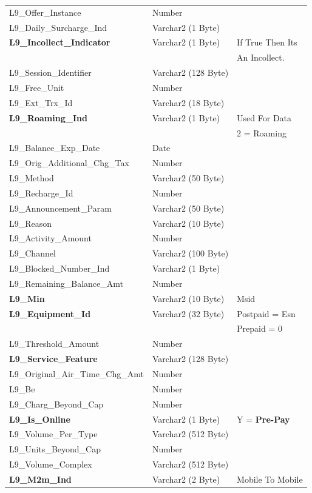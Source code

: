 \documentclass[12pt,twoside]{article}
\begin{document}
\begin{longtable}{l|l|l}
L9\_Offer\_Instance & Number & \\
L9\_Daily\_Surcharge\_Ind & Varchar2 (1 Byte) & \\
\textbf{L9\_Incollect\_Indicator} & Varchar2 (1 Byte) & If True Then Its\\
 &  & An Incollect.\\
L9\_Session\_Identifier & Varchar2 (128 Byte) & \\
L9\_Free\_Unit & Number & \\
L9\_Ext\_Trx\_Id & Varchar2 (18 Byte) & \\
\textbf{L9\_Roaming\_Ind} & Varchar2 (1 Byte) & Used For Data\\
 &  & 2 = Roaming\\
L9\_Balance\_Exp\_Date & Date & \\
L9\_Orig\_Additional\_Chg\_Tax & Number & \\
L9\_Method & Varchar2 (50 Byte) & \\
L9\_Recharge\_Id & Number & \\
L9\_Announcement\_Param & Varchar2 (50 Byte) & \\
L9\_Reason & Varchar2 (10 Byte) & \\
L9\_Activity\_Amount & Number & \\
L9\_Channel & Varchar2 (100 Byte) & \\
L9\_Blocked\_Number\_Ind & Varchar2 (1 Byte) & \\
L9\_Remaining\_Balance\_Amt & Number & \\
\textbf{L9\_Min} & Varchar2 (10 Byte) & Msid\\
\textbf{L9\_Equipment\_Id} & Varchar2 (32 Byte) & Postpaid = Esn\\
 &  & Prepaid = 0\\
L9\_Threshold\_Amount & Number & \\
\textbf{L9\_Service\_Feature} & Varchar2 (128 Byte) & \\
L9\_Original\_Air\_Time\_Chg\_Amt & Number & \\
L9\_Be & Number & \\
L9\_Charg\_Beyond\_Cap & Number & \\
\textbf{L9\_Is\_Online} & Varchar2 (1 Byte) & Y = \textbf{Pre-Pay}\\
L9\_Volume\_Per\_Type & Varchar2 (512 Byte) & \\
L9\_Units\_Beyond\_Cap & Number & \\
L9\_Volume\_Complex & Varchar2 (512 Byte) & \\
\textbf{L9\_M2m\_Ind} & Varchar2 (2 Byte) & Mobile To Mobile\\

\end{longtable}
\end{document}
